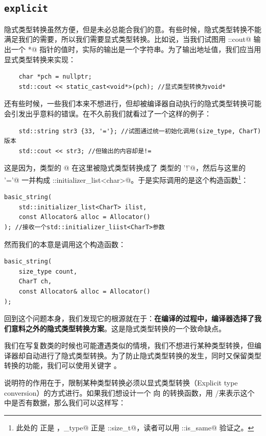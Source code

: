 \subsection*{\texttt{explicit}}
隐式类型转换虽然方便，但是未必总能合我们的意。有些时候，隐式类型转换不能满足我们的需要，所以我们需要显式类型转换。比如说，当我们试图用 \lstinline@std::cout@ 输出一个 \lstinline@char*@ 指针的值时，实际的输出是一个字符串。为了输出地址值，我们应当用显式类型转换来实现：
\begin{lstlisting}
    char *pch = nullptr;
    std::cout << static_cast<void*>(pch); //显式类型转换为void*
\end{lstlisting}\par
还有些时候，一些我们本来不想进行，但却被编译器自动执行的隐式类型转换可能会引发出乎意料的错误。在不久前我们就看过了一个这样的例子：
\begin{lstlisting}
    std::string str3 {33, '='}; //试图通过统一初始化调用(size_type, CharT)版本
    std::cout << str3; //但输出的内容却是!=
\end{lstlisting}
这是因为，\lstinline@int@ 类型的 @ 在这里被隐式类型转换成了 \lstinline@char@ 类型的 \lstinline@'!'@，然后与这里的 \lstinline@'='@ 一并构成 \lstinline@std::initializer_list<char>@。于是实际调用的是这个构造函数\footnote{此处的 \lstinline@CharT@ 正是 \lstinline@char@，\lstinline@size_type@ 正是 \lstinline@std::size_t@，读者可以用 \lstinline@std::is_same@ 验证之。}：
\begin{lstlisting}
basic_string(
    std::initializer_list<CharT> ilist,
    const Allocator& alloc = Allocator()
); //接收一个std::initializer_liist<CharT>参数
\end{lstlisting}
然而我们的本意是调用这个构造函数：
\begin{lstlisting}
basic_string(
    size_type count,
    CharT ch,
    const Allocator& alloc = Allocator()
);
\end{lstlisting}\par
回到这个问题本身，我们发现它的根源就在于：\textbf{在编译的过程中，编译器选择了我们意料之外的隐式类型转换方案}。这是隐式类型转换的一个致命缺点。\par
我们在写复数类的时候也可能遭遇类似的情境，我们不想进行某种类型转换，但编译器却自动进行了隐式类型转换。为了防止隐式类型转换的发生，同时又保留类型转换的功能，我们可以使用关键字 \lstinline@explicit@。\par
\lstinline@explicit@ 说明符的作用在于，限制某种类型转换必须以显式类型转换（Explicit type conversion）的方式进行。如果我们想设计一个 \lstinline@valarri@ 向 \lstinline@bool@ 的转换函数，用 \lstinline@true@/\lstinline@false@ 来表示这个 \lstinline@valarri@ 中是否有数据，那么我们可以这样写：
